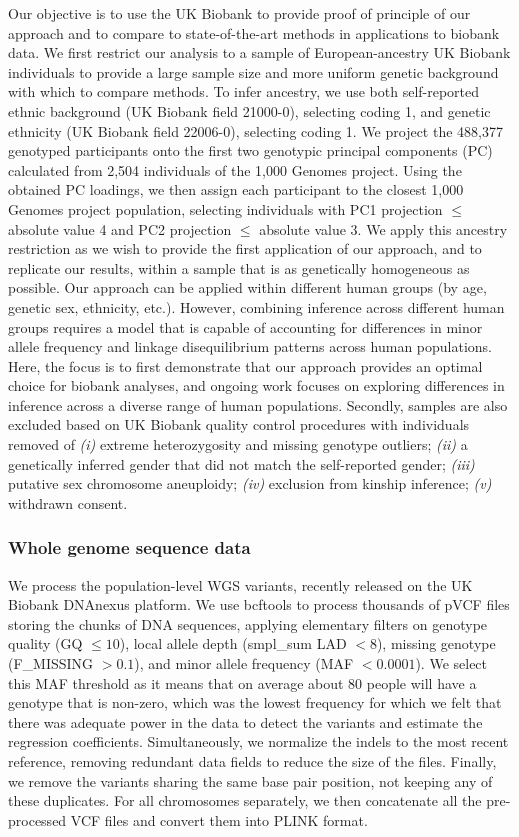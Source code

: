 Our objective is to use the UK Biobank to provide proof of principle of our approach and to compare to state-of-the-art methods in applications to biobank data. We first restrict our analysis to a sample of European-ancestry UK Biobank individuals to provide a large sample size and more uniform genetic background with which to compare methods. To infer ancestry, we use both self-reported ethnic background (UK Biobank field 21000-0), selecting coding 1, and genetic ethnicity (UK Biobank field 22006-0), selecting coding 1. We project the 488,377 genotyped participants onto the first two genotypic principal components (PC) calculated from 2,504 individuals of the 1,000 Genomes project. Using the obtained PC loadings, we then assign each participant to the closest 1,000 Genomes project population, selecting individuals with PC1 projection $\leq$ absolute value 4 and PC2 projection $\leq$ absolute value 3. We apply this ancestry restriction as we wish to provide the first application of our approach, and to replicate our results, within a sample that is as genetically homogeneous as possible. Our approach can be applied within different human groups (by age, genetic sex, ethnicity, etc.). However, combining inference across different human groups requires a model that is capable of accounting for differences in minor allele frequency and linkage disequilibrium patterns across human populations. Here, the focus is to first demonstrate that our approach provides an optimal choice for biobank analyses, and ongoing work focuses on exploring differences in inference across a diverse range of human populations. Secondly, samples are also excluded based on UK Biobank quality control procedures with individuals removed of \emph{(i)} extreme heterozygosity and missing genotype outliers; \emph{(ii)} a genetically inferred gender that did not match the self-reported gender; \emph{(iii)} putative sex chromosome aneuploidy; \emph{(iv)} exclusion from kinship inference; \emph{(v)} withdrawn consent. 

\subsubsection{Whole genome sequence data}
We process the population-level WGS variants, recently released on the UK Biobank DNAnexus platform. We use bcftools \cite{bcftools} to process thousands of pVCF files storing the chunks of DNA sequences, applying elementary filters on genotype quality (GQ $\le 10$), local allele depth (smpl\_sum LAD $< 8$), missing genotype (F\_MISSING $> 0.1$), and minor allele frequency (MAF $< 0.0001$). We select this MAF threshold as it means that on average about 80 people will have a genotype that is non-zero, which was the lowest frequency for which we felt that there was adequate power in the data to detect the variants and estimate the regression coefficients. Simultaneously, we normalize the indels to the most recent reference, removing redundant data fields to reduce the size of the files. Finally, we remove the variants sharing the same base pair position, not keeping any of these duplicates. For all chromosomes separately, we then concatenate all the pre-processed VCF files and convert them into PLINK format. 

